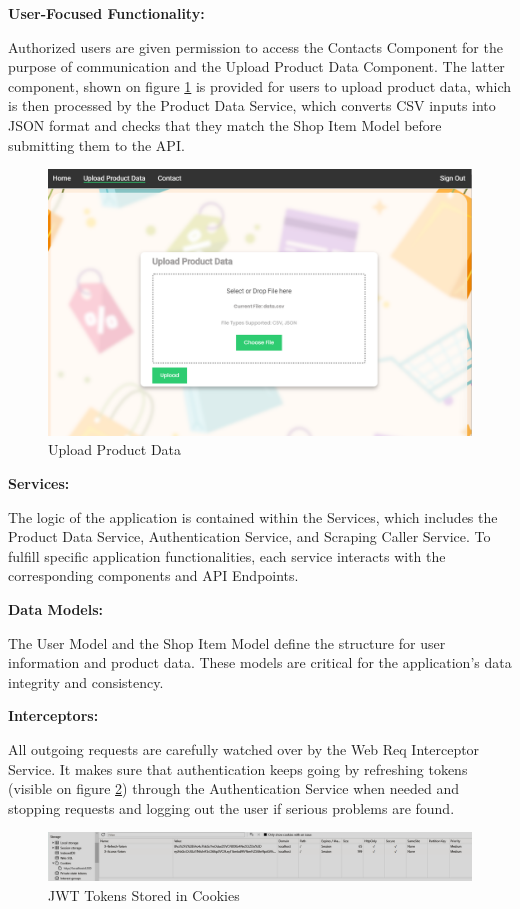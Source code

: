 \noindent\textbf{User-Focused Functionality:}

Authorized users are given permission to access the Contacts Component for the purpose of communication and the Upload Product Data Component. The latter component, shown on figure \ref{fig:uploaddata} is provided for users to upload product data, which is then processed by the Product Data Service, which converts CSV inputs into JSON format and checks that they match the Shop Item Model before submitting them to the API.

\begin{figure}[H]
	\centering
	\includegraphics[width=0.65\linewidth]{img/product_data_ss.png}
	\caption{Upload Product Data}
	\label{fig:uploaddata}
\end{figure}

\noindent\textbf{Services:} 

The logic of the application is contained within the Services, which includes the Product Data Service, Authentication Service, and Scraping Caller Service. To fulfill specific application functionalities, each service interacts with the corresponding components and API Endpoints.

\noindent\textbf{Data Models:} 

The User Model and the Shop Item Model define the structure for user information and product data. These models are critical for the application's data integrity and consistency.

\noindent\textbf{Interceptors:} 

All outgoing requests are carefully watched over by the Web Req Interceptor Service. It makes sure that authentication keeps going by refreshing tokens (visible on figure \ref{fig:cookies}) through the Authentication Service when needed and stopping requests and logging out the user if serious problems are found.

\begin{figure}[H]
	\centering
	\includegraphics[width=1\linewidth]{img/cookies_ss.png}
	\caption{JWT Tokens Stored in Cookies}
	\label{fig:cookies}
\end{figure}


